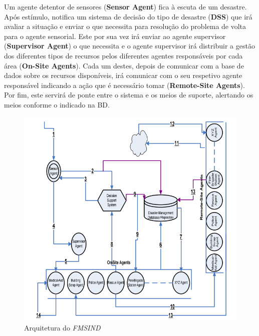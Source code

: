 \documentclass[a4paper]{article}
\begin{document}
Um agente detentor de sensores (\textbf{Sensor Agent}) fica à escuta de um desastre. Após estímulo, notifica um sistema de decisão do tipo de desastre (\textbf{DSS}) que irá avaliar a situação e enviar o que necessita para resolução do problema de volta para o agente sensorial. Este por sua vez irá enviar ao agente supervisor (\textbf{Supervisor Agent}) o que necessita e o agente supervisor irá distribuir a gestão dos diferentes tipos de recursos pelos diferentes agentes responsáveis por cada área (\textbf{On-Site Agents}). Cada um destes, depois de comunicar com a base de dados sobre os recursos disponíveis, irá comunicar com o seu respetivo agente responsável indicando a ação que é necessário tomar (\textbf{Remote-Site Agents}). Por fim, este servirá de ponte entre o sistema e os meios de suporte, alertando os meios conforme o indicado na BD.
\begin{figure}[!h]
    \centering
    \includegraphics[scale=0.65]{esquem-artigo.png}
    \caption{Arquitetura do \textit{FMSIND}}
\end{figure}
\end{document}
